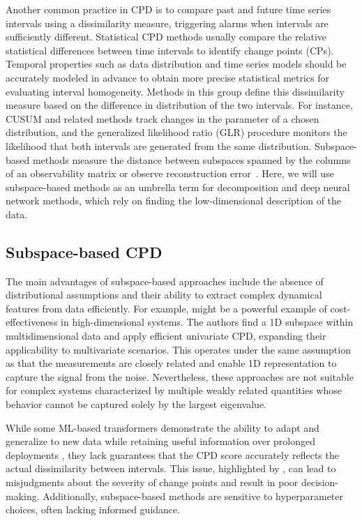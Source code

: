 Another common practice in CPD is to compare past and future time series intervals using a dissimilarity measure, triggering alarms when intervals are sufficiently different. Statistical CPD methods usually compare the relative statistical differences between time intervals to identify change points (CPs). Temporal properties such as data distribution and time series models should be accurately modeled in advance to obtain more precise statistical metrics for evaluating interval homogeneity. Methods in this group define this dissimilarity measure based on the difference in distribution of the two intervals. For instance, CUSUM and related methods \citet{Ye2023} track changes in the parameter of a chosen distribution, and the generalized likelihood ratio (GLR) procedure \citet{Xie2013, Korycki2021} monitors the likelihood that both intervals are generated from the same distribution. Subspace-based methods measure the distance between subspaces spanned by the columns of an observability matrix \citet{Moskvina2003, Kawahara2007} or observe reconstruction error~\citep{DeRyck2021, Bao2024}. Here, we will use subspace-based methods as an umbrella term for decomposition and deep neural network methods, which rely on finding the low-dimensional description of the data.  %

\subsection{Subspace-based CPD}\label{sec:subspace-based-cpd}
The main advantages of subspace-based approaches include the absence of distributional assumptions and their ability to extract complex dynamical features from data efficiently. For example, \citet{Hirabaru2016} might be a powerful example of cost-effectiveness in high-dimensional systems. The authors find a 1D subspace within multidimensional data and apply efficient univariate CPD, expanding their applicability to multivariate scenarios. This operates under the same assumption as \citet{Fathy2019} that the measurements are closely related and enable 1D representation to capture the signal from the noise. Nevertheless, these approaches are not suitable for complex systems characterized by multiple weakly related quantities whose behavior cannot be captured solely by the largest eigenvalue.

While some ML-based transformers demonstrate the ability to adapt and generalize to new data while retaining useful information over prolonged deployments \citep{Corizzo2022}, they lack guarantees that the CPD score accurately reflects the actual dissimilarity between intervals. This issue, highlighted by \citet{DeRyck2021}, can lead to misjudgments about the severity of change points and result in poor decision-making. Additionally, subspace-based methods are sensitive to hyperparameter choices, often lacking informed guidance.

